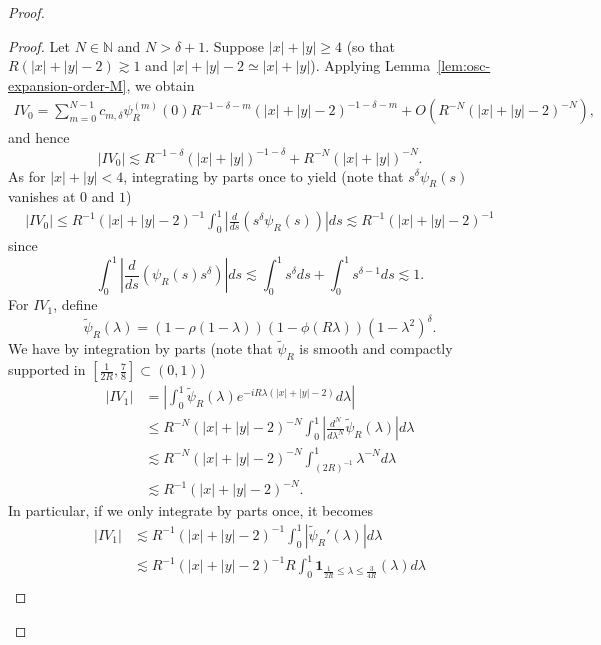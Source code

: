\documentclass[12pt]{amsart}
\begin{document}
\begin{proof}
\begin{proof}
Let $N\in \mathbb{N}$ and $N>\delta+1$. Suppose $|x|+|y|\ge 4$ (so that $R(|x|+|y|-2)\gtrsim 1$ and $|x|+|y|-2 \simeq |x|+|y|$). Applying Lemma~\ref{lem:osc-expansion-order-M}, we obtain 
\begin{align*}
    IV_0 = \sum_{m=0}^{N-1} c_{m,\delta} \psi_R^{(m)}(0) R^{-1-\delta-m} (|x|+|y|-2)^{-1-\delta-m} + O\left( R^{-N} (|x|+|y|-2)^{-N} \right),
\end{align*}
and hence
\begin{equation*}
    |IV_0|\lesssim R^{-1-\delta} (|x|+|y|)^{-1-\delta} + R^{-N} (|x|+|y|)^{-N}. 
\end{equation*}
As for $|x|+|y|<4$, integrating by parts once to yield (note that $s^\delta \psi_R(s)$ vanishes at $0$ and $1$)
\begin{align*}
    |IV_0| \le R^{-1}(|x|+|y|-2)^{-1} \int_0^1 \left|\frac{d}{ds} \left(s^\delta \psi_R(s)\right)\right| ds \lesssim R^{-1}(|x|+|y|-2)^{-1}
\end{align*}
since
\begin{equation*}
    \int_0^1 \left| \frac{d}{ds} \left( \psi_R(s) s^\delta \right) \right| ds \lesssim \int_0^1 s^\delta ds + \int_0^1 s^{\delta-1} ds \lesssim 1.
\end{equation*}
For $IV_1$, define
\begin{equation*}
    \widetilde{\psi}_R(\lambda) = \left(1-\rho(1-\lambda) \right)
(1-\phi(R\lambda))
(1-\lambda^2)^\delta.
\end{equation*}
We have by integration by parts (note that $\widetilde{\psi}_R$ is smooth and compactly supported in $[\frac{1}{2R}, \frac{7}{8}] \subset (0,1)$)
\begin{align*}
    |IV_1| &= \left|  \int_0^1 \widetilde{\psi}_R(\lambda)
e^{-iR\lambda(|x|+|y|-2)} d\lambda  \right|\\
&\le R^{-N}(|x|+|y|-2)^{-N} \int_0^1 \left|\frac{d^N}{d\lambda^N} \widetilde{\psi}_R(\lambda) \right| d\lambda \\
&\lesssim R^{-N}(|x|+|y|-2)^{-N} \int_{(2R)^{-1}}^1 \lambda^{-N} d\lambda\\
&\lesssim R^{-1}(|x|+|y|-2)^{-N}. 
\end{align*}
In particular, if we only integrate by parts once, it becomes
\begin{align*}
    |IV_1| &\lesssim R^{-1} (|x|+|y|-2)^{-1} \int_0^1 |\widetilde{\psi}_R'(\lambda)| d\lambda\\
    &\lesssim R^{-1} (|x|+|y|-2)^{-1} R \int_0^1  \mathbf{1}_{ \frac{1}{2R} \le  \lambda \le \frac{3}{4R}}(\lambda) d\lambda\\

\end{align*}
\end{proof}
\end{proof}
\end{document}

